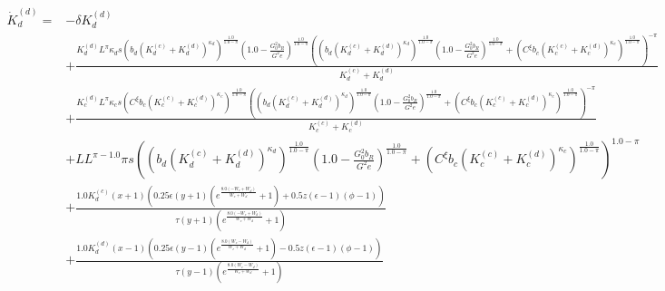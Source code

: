\begin{align*}
  \dot{K}_d^{(d)} =& - \delta K^{(d)}_{d} \\
    &+ \frac{K^{(d)}_{d} L^{\pi} \kappa_{d} s \left(b_{d} \left(K^{(c)}_{d} + K^{(d)}_{d}\right)^{\kappa_{d}}\right)^{\frac{1.0}{1.0 - \pi}} \left(1.0 - \frac{G_{0}^{2} b_{R}}{G^{2} e}\right)^{\frac{1.0}{1.0 - \pi}} \left(\left(b_{d} \left(K^{(c)}_{d} + K^{(d)}_{d}\right)^{\kappa_{d}}\right)^{\frac{1.0}{1.0 - \pi}} \left(1.0 - \frac{G_{0}^{2} b_{R}}{G^{2} e}\right)^{\frac{1.0}{1.0 - \pi}} + \left(C^{\xi} b_{c} \left(K^{(c)}_{c} + K^{(d)}_{c}\right)^{\kappa_{c}}\right)^{\frac{1.0}{1.0 - \pi}}\right)^{- \pi}}{K^{(c)}_{d} + K^{(d)}_{d}} \\
    &+ \frac{K^{(d)}_{c} L^{\pi} \kappa_{c} s \left(C^{\xi} b_{c} \left(K^{(c)}_{c} + K^{(d)}_{c}\right)^{\kappa_{c}}\right)^{\frac{1.0}{1.0 - \pi}} \left(\left(b_{d} \left(K^{(c)}_{d} + K^{(d)}_{d}\right)^{\kappa_{d}}\right)^{\frac{1.0}{1.0 - \pi}} \left(1.0 - \frac{G_{0}^{2} b_{R}}{G^{2} e}\right)^{\frac{1.0}{1.0 - \pi}} + \left(C^{\xi} b_{c} \left(K^{(c)}_{c} + K^{(d)}_{c}\right)^{\kappa_{c}}\right)^{\frac{1.0}{1.0 - \pi}}\right)^{- \pi}}{K^{(c)}_{c} + K^{(d)}_{c}} \\
    &+ L L^{\pi - 1.0} \pi s \left(\left(b_{d} \left(K^{(c)}_{d} + K^{(d)}_{d}\right)^{\kappa_{d}}\right)^{\frac{1.0}{1.0 - \pi}} \left(1.0 - \frac{G_{0}^{2} b_{R}}{G^{2} e}\right)^{\frac{1.0}{1.0 - \pi}} + \left(C^{\xi} b_{c} \left(K^{(c)}_{c} + K^{(d)}_{c}\right)^{\kappa_{c}}\right)^{\frac{1.0}{1.0 - \pi}}\right)^{1.0 - \pi} \\
    &+ \frac{1.0 K^{(c)}_{d} \left(x + 1\right) \left(0.25 \epsilon \left(y + 1\right) \left(e^{\frac{8.0 \left(- W_{c} + W_{d}\right)}{W_{c} + W_{d}}} + 1\right) + 0.5 z \left(\epsilon - 1\right) \left(\phi - 1\right)\right)}{\tau \left(y + 1\right) \left(e^{\frac{8.0 \left(- W_{c} + W_{d}\right)}{W_{c} + W_{d}}} + 1\right)} \\
    &+ \frac{1.0 K^{(d)}_{d} \left(x - 1\right) \left(0.25 \epsilon \left(y - 1\right) \left(e^{\frac{8.0 \left(W_{c} - W_{d}\right)}{W_{c} + W_{d}}} + 1\right) - 0.5 z \left(\epsilon - 1\right) \left(\phi - 1\right)\right)}{\tau \left(y - 1\right) \left(e^{\frac{8.0 \left(W_{c} - W_{d}\right)}{W_{c} + W_{d}}} + 1\right)}
\end{align*}

